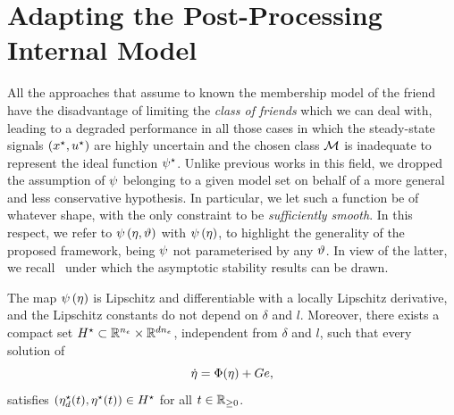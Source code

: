 \section{Adapting the Post-Processing Internal Model}
All the approaches that assume to known the membership model of the friend have the 
disadvantage of limiting the \textit{class of friends} which we can deal with, leading to a
degraded performance in all those cases in which the steady-state signals $\left( x^{\star}, u^{\star} \right)$ are highly uncertain
and the chosen class $\mathcal{M}$ is inadequate to represent the ideal function $\psi^{\star}$.
Unlike previous works in this field, we dropped the assumption of $\psi$ belonging to a given model set on
behalf of a more general and less conservative hypothesis.
In particular, we let such a function be of whatever shape, with the only constraint to be \textit{sufficiently smooth}.
In this respect, we refer to $\psi \left( \eta, \vartheta \right)$ with $\psi \left( \eta \right)$, to highlight the generality
of the proposed framework, being $\psi$ not parameterised by any $\vartheta$.
In view of the latter, we recall~\cite[Assumption~A3]{bin2019class} under which the asymptotic stability results can be drawn.
\begin{assumption}%
	\label{ASSUM:INTERNAL-MODEL}
	The map $\psi \left( \eta \right)$ is Lipschitz and differentiable with a locally Lipschitz derivative,
	and the Lipschitz constants do not depend on $\delta$ and $l$.
	Moreover, there exists a compact set $H^{\star} \subset \mathbb{R}^{n_{e}} \times \mathbb{R}^{d n_{e}}$, independent from $\delta$ and $l$,
	such that every solution of
	\begin{equation*}
		\dot{\eta} = \Phi(\eta) + Ge,
	\end{equation*}
	satisfies $\left( \eta_d^{\star}(t), \eta^{\star}(t) \right) \in H^{\star}$ for all $t \in \mathbb{R}_{\ge 0}$.
\end{assumption}

